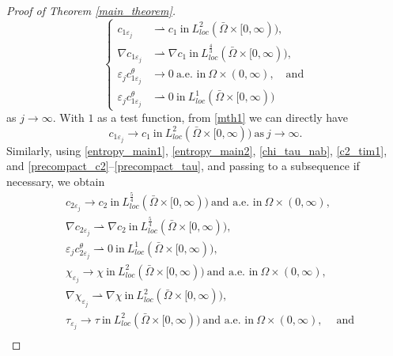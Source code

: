 \documentclass[a4paper,10pt]{article}
\theoremstyle{definition}
\begin{document}
\begin{proof}[Proof of Theorem \ref{main_theorem}]
\begin{equation}
\begin{cases}
  c_{1\varepsilon_j} & \rightharpoonup c_1 ~\text{in}~ L^2_{loc}(\bar{\Omega} \times [0, \infty)),                                                  \\[5pt]
  \nabla c_{1\varepsilon_j} & \rightharpoonup \nabla c_1 ~\text{in}~ L^{\frac{4}{3}}_{loc}(\bar{\Omega} \times [0, \infty)),                        \\[5pt]
  \varepsilon_j c_{1\varepsilon_j}^\theta & \to 0 ~\text{a.e. in}~ \Omega \times (0, \infty),      \quad \text{and}                                    \\[5pt]
  \varepsilon_j c_{1\varepsilon_j}^\theta & \rightharpoonup 0 ~\text{in}~ L_{loc}^1(\bar{\Omega} \times [0, \infty))
\end{cases}
\end{equation}
as $j \to \infty$. With $1$ as a test function, from \eqref{mth1} we can directly have
\begin{equation}
  \label{mth411}
   c_{1\varepsilon_j} \to c_1 ~\text{in}~ L^2_{loc}(\bar{\Omega} \times [0, \infty)) ~ \text{as} ~ j \to \infty.
\end{equation}
Similarly, using \eqref{entropy_main1}, \eqref{entropy_main2}, \eqref{chi_tau_nab}, \eqref{c2_tim1}, and \eqref{precompact_c2}--\eqref{precompact_tau}, and passing to a subsequence if necessary, we obtain
\begin{align}
  \label{mth4} & c_{2\varepsilon_j} \to c_2 ~\text{in}~ L^{\frac{5}{4}}_{loc}(\bar{\Omega} \times [0, \infty)) ~\text{and a.e. in}~ \Omega \times (0, \infty),                        \\[5pt]
  \label{mth5} & \nabla c_{2\varepsilon_j}  \rightharpoonup \nabla c_2 ~\text{in}~ L^{\frac{5}{4}}_{loc}(\bar{\Omega} \times [0, \infty)),                                            \\[5pt]
  \label{eps2} & \varepsilon_j c_{2\varepsilon_j}^\theta \rightharpoonup 0 ~\text{in}~ L^1_{loc}(\bar{\Omega} \times [0, \infty)),                                                    \\[5pt]
  \label{mth6} & \chi_{\varepsilon_j} \to \chi ~\text{in}~ L^{2}_{loc}(\bar{\Omega} \times [0, \infty)) ~\text{and a.e. in}~ \Omega \times (0, \infty),                                     \\[5pt]
  \label{mth7} & \nabla \chi_{\varepsilon_j}  \rightharpoonup \nabla \chi ~\text{in}~ L^{2}_{loc}(\bar{\Omega} \times [0, \infty)),                                                         \\[5pt]
  \label{mth8} & \tau_{\varepsilon_j} \to \tau ~\text{in}~ L^{2}_{loc}(\bar{\Omega} \times [0, \infty)) ~\text{and a.e. in}~ \Omega \times (0, \infty),  \quad ~\text{and}            \\[5pt]

\end{align}
\end{proof}
\end{document}
